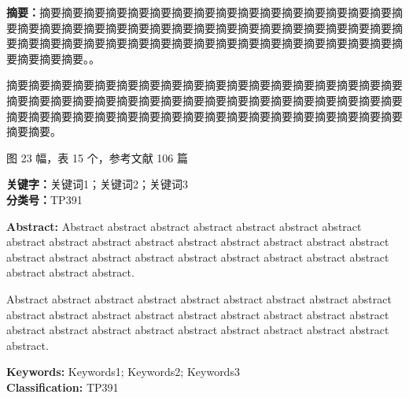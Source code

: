 \documentclass{csuthesis}
\author{作者}
\begin{document}
    \frontfrontmatter
	\makecoverpage
	
	\ifblindreview	%
	\else
	\maketitlepage
	
	\announcement
	\fi

    \cleardoublepage %
    \frontmatter
    \begin{abstractcn}
        \noindent
        {\heiti \textbf{摘要：}}摘要摘要摘要摘要摘要摘要摘要摘要摘要摘要摘要摘要摘要摘要摘要摘要摘要摘要摘要摘要摘要摘要摘要摘要摘要摘要摘要摘要摘要摘要摘要摘要摘要摘要摘要摘要摘要摘要摘要摘要摘要摘要摘要摘要摘要摘要摘要摘要摘要摘要摘要摘要摘要摘要摘要摘要。。
        
        摘要摘要摘要摘要摘要摘要摘要摘要摘要摘要摘要摘要摘要摘要摘要摘要摘要摘要摘要摘要摘要摘要摘要摘要摘要摘要摘要摘要摘要摘要摘要摘要摘要摘要摘要摘要摘要摘要摘要摘要摘要摘要摘要摘要摘要摘要摘要摘要摘要摘要摘要摘要摘要摘要摘要摘要。
        
        \vspace*{\baselineskip}
        \noindent
        图 23 幅，表 15 个，参考文献 106 篇
        
		\vspace*{2\baselineskip}
		\noindent
        {\heiti\textbf{关键字：}}关键词1；关键词2；关键词3\\
        {\heiti\textbf{分类号：}}TP391

    \end{abstractcn}

	\begin{abstracten}
		\noindent
		\textbf{Abstract:} Abstract abstract abstract abstract abstract abstract abstract abstract abstract abstract abstract abstract abstract abstract abstract abstract abstract abstract abstract abstract abstract abstract abstract abstract abstract abstract abstract abstract. 
		
		Abstract abstract abstract abstract abstract abstract abstract abstract abstract abstract abstract abstract abstract abstract abstract abstract abstract abstract abstract abstract abstract abstract abstract abstract abstract abstract abstract abstract.
		
		\vspace*{2\baselineskip}
		\noindent
		{\textbf{Keywords:}} Keywords1; Keywords2; Keywords3\\
		{\textbf{Classification:}} TP391
	\end{abstracten}
\end{document}
